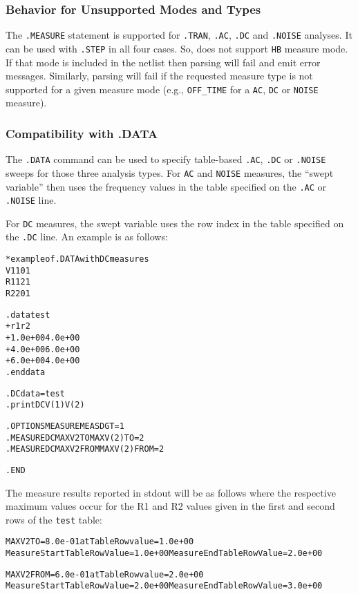 \subsubsection{Behavior for Unsupported Modes and Types}
\label{Measure_Unsupported_Types}
The \texttt{.MEASURE} statement is supported
for \texttt{.TRAN}, \texttt{.AC}, \texttt{.DC} and \texttt{.NOISE}
analyses. It can be used with {\tt .STEP} in all four cases.
So, \Xyce{} does not support \texttt{HB} measure mode.  If that mode
is included in the netlist then \Xyce{}
parsing will fail and emit error messages.  Similarly, \Xyce{} parsing
will fail if the requested measure type is not supported for a given
measure mode (e.g., \texttt{OFF\_TIME} for a \texttt{AC}, \texttt{DC}
or \texttt{NOISE} measure).

\subsubsection{Compatibility with .DATA}
The \texttt{.DATA} command can be used to specify table-based \texttt{.AC},
\texttt{.DC} or \texttt{.NOISE} sweeps for those three analysis types. For
\texttt{AC} and \texttt{NOISE} measures, the ``swept variable'' then uses
the frequency values in the table specified on the \texttt{.AC} or
\texttt{.NOISE} line.

For \texttt{DC} measures, the swept variable uses the row index in the
table specified on the \texttt{.DC} line.  An example is as follows:
\begin{alltt}
* example of .DATA with DC measures
V1 1 0 1
R1 1 2 1
R2 2 0 1

.data test
+ r1           r2
+ 1.0e+00  4.0e+00
+ 4.0e+00  6.0e+00
+ 6.0e+00  4.0e+00
.enddata

.DC data=test
.print DC V(1) V(2)

.OPTIONS MEASURE MEASDGT=1
.MEASURE DC MAXV2TO MAX V(2) TO=2
.MEASURE DC MAXV2FROM MAX V(2) FROM=2

.END
\end{alltt}

The measure results reported in stdout will be as follows where the respective
maximum values occur for the R1 and R2 values given in the first and second rows
of the \texttt{test} table:
\begin{alltt}
MAXV2TO = 8.0e-01 at Table Row value = 1.0e+00
Measure Start Table Row Value= 1.0e+00  Measure End Table Row Value= 2.0e+00

MAXV2FROM = 6.0e-01 at Table Row value = 2.0e+00
Measure Start Table Row Value= 2.0e+00  Measure End Table Row Value= 3.0e+00
\end{alltt}

